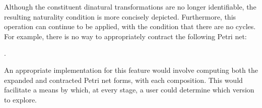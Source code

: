 \documentclass[../Dissertation.tex]{subfiles}
\begin{document}
Although the constituent dinatural transformations are no longer identifiable, the resulting naturality condition is more concisely depicted. Furthermore, this operation can continue to be applied, with the condition that there are no cycles. For example, there is no way to appropriately contract the following Petri net:
\begin{center}
  .
\end{center}

An appropriate implementation for this feature would involve computing both the expanded and contracted Petri net forms, with each composition. This would facilitate a means by which, at every stage, a user could determine which version to explore.
\end{document}
